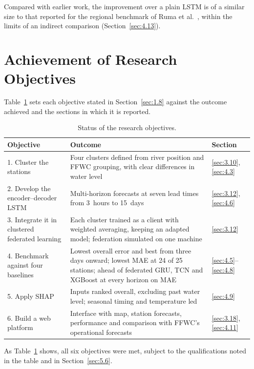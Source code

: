 Compared with earlier work, the improvement over a plain LSTM is of a similar
size to that reported for the regional benchmark of Ruma et al.\
\cite{Ruma2023}, within the limits of an indirect comparison
(Section~\ref{sec:4.13}).

\section{Achievement of Research Objectives}
\label{sec:5.4}

Table~\ref{tab:5.1} sets each objective stated in Section~\ref{sec:1.8} against
the outcome achieved and the sections in which it is reported.

\begin{table}[H]
\centering
\caption{Status of the research objectives.}
\label{tab:5.1}
\small
\begin{tabular}{p{}p{}p{}}
\hline
\textbf{Objective} & \textbf{Outcome} & \textbf{Section} \\
\hline
1. Cluster the stations & Four clusters defined from river position and FFWC
grouping, with clear differences in water level & \ref{sec:3.10}, \ref{sec:4.3} \\
2. Develop the encoder--decoder LSTM & Multi-horizon forecasts at seven lead
times from 3~hours to 15~days & \ref{sec:3.12}, \ref{sec:4.6} \\
3. Integrate it in clustered federated learning & Each cluster trained as a
client with weighted averaging, keeping an adapted model; federation simulated
on one machine & \ref{sec:3.12} \\
4. Benchmark against four baselines & Lowest overall error and best from three
days onward; lowest MAE at 24 of 25 stations; ahead of federated GRU, TCN and
XGBoost at every horizon on MAE & \ref{sec:4.5}--\ref{sec:4.8} \\
5. Apply SHAP & Inputs ranked overall, excluding past water level; seasonal
timing and temperature led & \ref{sec:4.9} \\
6. Build a web platform & Interface with map, station forecasts, performance
and comparison with FFWC's operational forecasts & \ref{sec:3.18}, \ref{sec:4.11} \\
\hline
\end{tabular}
\end{table}

As Table~\ref{tab:5.1} shows, all six objectives were met, subject to the
qualifications noted in the table and in Section~\ref{sec:5.6}.

